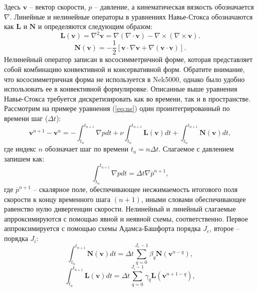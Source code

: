 Здесь $\textbf{v}$ -- вектор скорости, $p$ -- давление, а кинематическая вязкость обозначается $\nabla$. 
%
Линейные и нелинейные операторы в уравнениях Навье-Стокса обозначаются как $\textbf{L}$ и $\textbf{N}$ 
и определяются следующим образом:
%
\begin{equation}\label{eq:linear}
    \textbf{L} (\textbf{v}) = \nabla^2 \textbf{v} = \nabla(\nabla \cdot \textbf{v}) - 
    \nabla \times (\nabla \times \textbf{v}).
\end{equation}
%
\begin{equation}\label{eq:nonlin}
    \textbf{N} (\textbf{v}) = - \frac{1}{2}[\textbf{v} \cdot \nabla \textbf{v} + 
    \nabla (\textbf{v} \cdot \textbf{v})]. 
\end{equation}
%
Нелинейный оператор записан в кососимметричной форме, которая представляет собой 
комбинацию конвективной и консервативной форм. 
%
Обратите внимание, что кососимметричная форма не используется в Nek5000, однако 
было удобно использовать ее в конвективной формулировке. 
%
Описанные выше уравнения Навье-Стокса требуется дискретизировать как во времени, так и в пространстве. 
%
Рассмотрим на примере уравнения (\ref{eq:ns}) один проинтегрированный по времени шаг ($\Delta t$):
%
\begin{equation}\label{eq:tstep}
    \textbf{v}^{n+1} - \textbf{v}^n = - \int^{t_{n+1}}_{t_n} \nabla p dt + 
    \nu  \int^{t_{n+1}}_{t_n} \textbf{L} (\textbf{v}) dt + \int^{t_{n+1}}_{t_n} \textbf{N} (\textbf{v}) dt, 
\end{equation}
%
где индекс $n$ обозначает шаг по времени $t_n = n \Delta t$.
%
Слагаемое с давлением запишем как:
%
\begin{equation}\label{eq:pres}
    \int^{t_{n+1}}_{t_n} \nabla p dt = \Delta t \nabla \overline{p}^{n+1},
\end{equation}        
%
где $\overline{p}^{n+1}$ -- скалярное поле, обеспечивающее несжимаемость итогового поля скорости 
к концу временного шага $(n+1)$, иными словами обеспечивающее равенство нулю дивергенции скорости.
%
Нелинейный и линейный слагаемые апрроксимируются с помощью явной и неявной схемы, соответственно.
%
Первое аппроксимируется с помощью схемы Адамса-Башфорта порядка $J_e$,
второе -- порядка $J_i$:
%
\begin{equation}\label{eq:nln}
    \int^{t_{n+1}}_{t_n} \textbf{N} (\textbf{v}) dt = \Delta t \sum_{q=0}^{J_e - 1} \beta_q \textbf{N} (\textbf{v}^{n-q}) ,
\end{equation}        
%
%
\begin{equation}\label{eq:ln}
    \int^{t_{n+1}}_{t_n} \textbf{L} (\textbf{v}) dt = \Delta t \sum_{q=0}^{J_i - 1} \gamma_q \textbf{L} (\textbf{v}^{n+1-q}) ,
\end{equation}        
